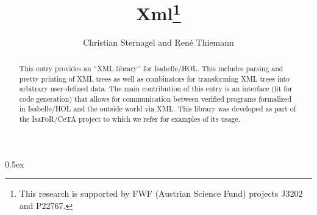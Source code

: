 \documentclass[11pt,a4paper]{article}
\begin{document}
\title{Xml\thanks{This research is supported by FWF (Austrian Science Fund) projects J3202 and P22767.}}
\author{Christian Sternagel and Ren\'e Thiemann}
\maketitle

\begin{abstract}
This entry provides an ``XML library'' for Isabelle/HOL. This includes parsing
and pretty printing of XML trees as well as combinators for transforming XML
trees into arbitrary user-defined data. The main contribution of this entry is
an interface (fit for code generation) that allows for communication between
verified programs formalized in Isabelle/HOL and the outside world via XML. This
library was developed as part of the IsaFoR/CeTA project to which we refer for
examples of its usage. 
\end{abstract}

\tableofcontents

\parindent 0pt\parskip 0.5ex


\end{document}
